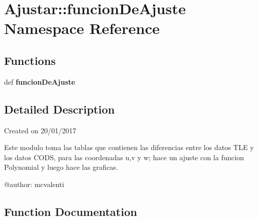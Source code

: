 \section{\-Ajustar\-:\-:funcion\-De\-Ajuste \-Namespace \-Reference}
\label{namespace_ajustar_1_1funcion_de_ajuste}
\subsection*{\-Functions}
\begin{DoxyCompactItemize}
\item 
def {\bf funcion\-De\-Ajuste}
\end{DoxyCompactItemize}


\subsection{\-Detailed \-Description}
\begin{DoxyVerb}
Created on 20/01/2017

Este modulo toma las tablas que contienen las diferencias 
entre los datos TLE y los datos CODS, para las coordenadas
u,v y w; hace un ajuste con la funcion Polynomial y luego
hace las graficas. 

@author: mcvalenti
\end{DoxyVerb}
 

\subsection{\-Function \-Documentation}

